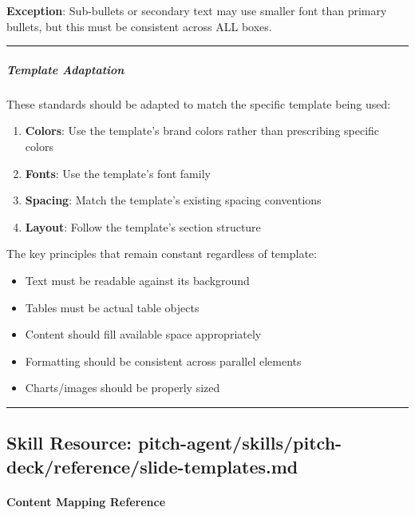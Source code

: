 \documentclass[11pt]{article}
\begin{document}
\textbf{Exception}: Sub-bullets or secondary text may use smaller font than primary bullets, but this must be consistent across ALL boxes.


\vspace{0.5em}\hrule\vspace{0.5em}

\subparagraph{Template Adaptation}\mbox{}\par

These standards should be adapted to match the specific template being used:


\begin{enumerate}[leftmargin=*,itemsep=2pt,topsep=2pt]
\item {} \textbf{Colors}: Use the template's brand colors rather than prescribing specific colors
\item {} \textbf{Fonts}: Use the template's font family
\item {} \textbf{Spacing}: Match the template's existing spacing conventions
\item {} \textbf{Layout}: Follow the template's section structure
\end{enumerate}

The key principles that remain constant regardless of template:

\begin{itemize}[leftmargin=*,itemsep=2pt,topsep=2pt]
\item {} Text must be readable against its background
\item {} Tables must be actual table objects
\item {} Content should fill available space appropriately
\item {} Formatting should be consistent across parallel elements
\item {} Charts/images should be properly sized
\end{itemize}

\vspace{0.8em}\hrule\vspace{0.8em}

\subsection{Skill Resource: pitch-agent/skills/pitch-deck/reference/slide-templates.md}\label{file:pitch-agent-skills-pitch-deck-reference-slide-templates-md}

\paragraph{Content Mapping Reference}\mbox{}\par
\end{document}
